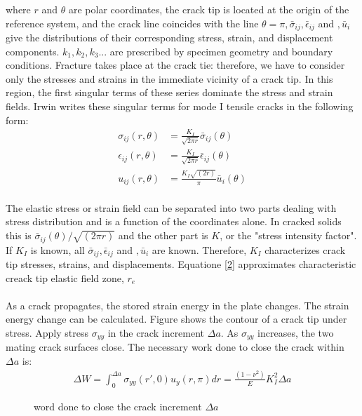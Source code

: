 \documentclass[12pt]{article}
\begin{document}
where $r$ and $\theta$ are polar coordinates, the crack tip is located at the origin of the reference system, and
the crack line coincides with the line $\theta = \pi, \bar{\sigma}_{ij}, \bar{\epsilon}_{ij}$ and $, \bar{u}_{i}$ give the distributions of their corresponding 
stress, strain, and displacement components. $k_1, k_2, k_3. . .$ are 
prescribed by specimen geometry and boundary conditions.
Fracture takes place at the crack tie: therefore, we have 
to consider only the stresses and strains in the immediate 
vicinity of a crack tip. In this region, the first singular terms of 
these series dominate the stress and strain fields. Irwin writes these singular 
terms for mode I tensile cracks in the following form:
\begin{align*} 
    \sigma_{ij}(r, \theta) &= \frac{K_I}{\sqrt{2 \pi r}} \bar{\sigma}_{ij}(\theta) 
    \\\epsilon_{ij}(r, \theta) &= \frac{K_I}{\sqrt{2 \pi r}} \bar{\epsilon}_{ij}(\theta) \tag{2} \label{2}
    \\u_{ij}(r, \theta) &= \frac{K_I \sqrt{(2 r)}}{\pi} \bar{u}_{i}(\theta)
\end{align*}
\\The elastic stress or strain field can be separated into two parts dealing with stress distribution and is a function of the coordinates alone.
 In cracked solids this is $\bar{\sigma}_{ij}(\theta)/\sqrt{(2 \pi r)}$ and 
 the other part is $K$, or the "stress intensity factor".
If $K_I$ is known, all $\bar{\sigma}_{ij}, \bar{\epsilon}_{ij}$ and $, \bar{u}_{i}$ are known. Therefore, 
$K_I$ characterizes crack tip stresses, strains, and displacements.
Equatione \eqref{2} approximates characteristic creack tip elastic field zone, $r_e$
\\\\As a crack propagates, the stored strain energy in the plate changes. The strain energy change can be
calculated. Figure shows the contour of a crack tip under stress. Apply stress $\sigma_{yy}$ in the crack
increment $\Delta a$. As $\sigma_{yy}$ increases, the two mating crack surfaces close. The necessary work done to close
the crack within $\Delta a$ is:
\begin{align*}
    \Delta W = \int_{0}^{\Delta a} \sigma_{yy}(r', 0)u_y(r, \pi)dr = \frac{(1 - \nu ^ 2)}{E} K_{I}^2 \Delta a \tag{3} \label{3}
\end{align*}
\begin{figure}[H]
    \centering
    \captionsetup{labelformat=empty}
    \caption{word done to close the crack increment $\Delta a$}
    
\end{figure}
\end{document}
